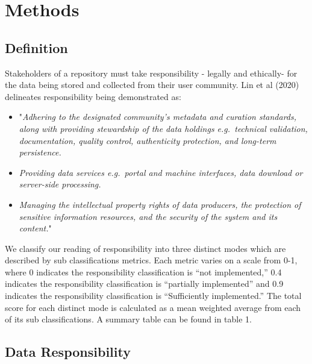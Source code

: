 \documentclass{article}
\begin{document}
\newpage

\hypertarget{methods}{%
\section{Methods}\label{methods}}

\hypertarget{definition}{%
\subsection{Definition}\label{definition}}

Stakeholders of a repository must take responsibility - legally and
ethically- for the data being stored and collected from their user
community. Lin et al (2020) delineates responsibility being demonstrated
as:

\begin{itemize}
\item
  "\emph{Adhering to the designated community's metadata and curation
  standards, along with providing stewardship of the data holdings
  e.g.~technical validation, documentation, quality control,
  authenticity protection, and long-term persistence.}
\item
  \emph{Providing data services e.g.~portal and machine interfaces, data
  download or server-side processing.}
\item
  \emph{Managing the intellectual property rights of data producers, the
  protection of sensitive information resources, and the security of the
  system and its content.}"
\end{itemize}

We classify our reading of responsibility into three distinct modes
which are described by sub classifications metrics. Each metric varies
on a scale from 0-1, where 0 indicates the responsibility classification
is ``not implemented,'' 0.4 indicates the responsibility classification
is ``partially implemented'' and 0.9 indicates the responsibility
classification is ``Sufficiently implemented.'' The total score for each
distinct mode is calculated as a mean weighted average from each of its
sub classifications. A summary table can be found in table 1.

\hypertarget{data-responsibility}{%
\subsection{Data Responsibility}\label{data-responsibility}}
\end{document}
